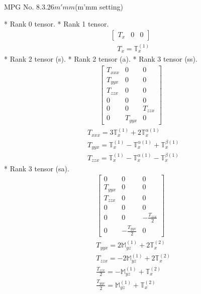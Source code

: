 \documentclass[fleqn,8pt,landscape]{jsarticle}
\begin{document}
\setcounter{MaxMatrixCols}{32}

\renewcommand{\tablename}{Table~}
\renewcommand{\figurename}{Figure~}
\begin{center}
\LARGE
MPG No. 8.3.26\quad$m'mm$\quad(m'mm setting)
\end{center}
* Rank 0 tensor.
* Rank 1 tensor.
\begin{align*}
\begin{bmatrix} T_{x} & 0 & 0 \end{bmatrix}
\end{align*}
\begin{align*}
& T_{x} = \mathbb{T}_{x}^{(1)}
\end{align*}
* Rank 2 tensor (s).
* Rank 2 tensor (a).
* Rank 3 tensor (ss).
\begin{align*}
\begin{bmatrix} T_{xxx} & 0 & 0 \\ T_{yyx} & 0 & 0 \\ T_{zzx} & 0 & 0 \\ 0 & 0 & 0 \\ 0 & 0 & T_{zzx} \\ 0 & T_{yyx} & 0 \end{bmatrix}
\end{align*}
\begin{align*}
& T_{xxx} = 3 \mathbb{T}_{x}^{(1)} + 2 \mathbb{T}_{x}^{\alpha(1)} \\
& T_{yyx} = \mathbb{T}_{x}^{(1)} - \mathbb{T}_{x}^{\alpha(1)} + \mathbb{T}_{x}^{\beta(1)} \\
& T_{zzx} = \mathbb{T}_{x}^{(1)} - \mathbb{T}_{x}^{\alpha(1)} - \mathbb{T}_{x}^{\beta(1)}
\end{align*}
* Rank 3 tensor (sa).
\begin{align*}
\begin{bmatrix} 0 & 0 & 0 \\ T_{yyx} & 0 & 0 \\ T_{zzx} & 0 & 0 \\ 0 & 0 & 0 \\ 0 & 0 & - \frac{T_{zzx}}{2} \\ 0 & - \frac{T_{yyx}}{2} & 0 \end{bmatrix}
\end{align*}
\begin{align*}
& T_{yyx} = 2 \mathbb{M}_{yz}^{(1)} + 2 \mathbb{T}_{x}^{(2)} \\
& T_{zzx} = - 2 \mathbb{M}_{yz}^{(1)} + 2 \mathbb{T}_{x}^{(2)} \\
& \frac{T_{zzx}}{2} = - \mathbb{M}_{yz}^{(1)} + \mathbb{T}_{x}^{(2)} \\
& \frac{T_{yyx}}{2} = \mathbb{M}_{yz}^{(1)} + \mathbb{T}_{x}^{(2)}
\end{align*}
\end{document}

